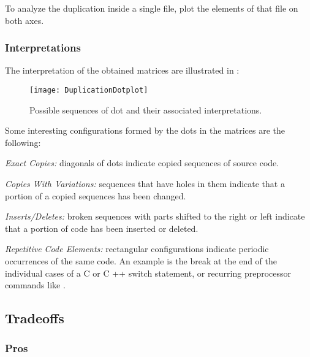 \documentclass[a4paper,10pt,twoside]{book}
\begin{document}
To analyze the duplication inside a single file, plot the elements of that file on both axes.

\subsubsection*{Interpretations}

The interpretation of the obtained matrices are illustrated in :

\begin{figure}
\begin{center}
\texttt{[image: DuplicationDotplot]}
\caption{Possible sequences of dot and their associated interpretations.}
\end{center}
\end{figure}

Some interesting configurations formed by the dots in the matrices are the following:

\begin{bulletlist}
\item \emph{Exact Copies:} diagonals of dots indicate copied sequences of source code.

\item \emph{Copies With Variations:} sequences that have holes in them indicate that a portion of a copied sequences has been changed.

\item \emph{Inserts/Deletes:} broken sequences with parts shifted to the right or left indicate that a portion of code has been inserted or deleted.

\item \emph{Repetitive Code Elements:} rectangular configurations indicate periodic occurrences of the same code. An example is the break at the end of the individual cases of a C or C ++ switch statement, or recurring preprocessor commands like .
\end{bulletlist}

\subsection*{Tradeoffs}

\subsubsection*{Pros}
\end{document}
